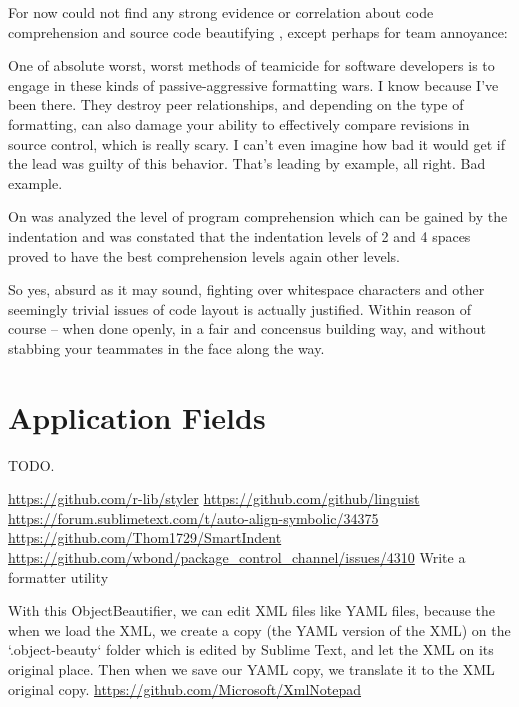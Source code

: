     For now could not find any strong evidence or correlation about code
    comprehension and source code beautifying \cite{improvingCodeReadability},
    except perhaps for team annoyance:

    \begin{citacao}
    One of absolute worst, worst methods of teamicide for software developers is to engage
    in these kinds of passive-aggressive formatting wars. I know because I've been there.
    They destroy peer relationships, and depending on the type of formatting, can also damage
    your ability to effectively compare revisions in source control, which is really scary.
    I can't even imagine how bad it would get if the lead was guilty of this behavior. That's
    leading by example, all right. Bad example. \cite{Atwood}
    \end{citacao}

    On  was analyzed the level of program
    comprehension which can be gained by the indentation and was constated that
    the indentation levels of 2 and 4 spaces proved to have the best
    comprehension levels again other levels.

    \begin{citacao}
    So yes, absurd as it may sound, fighting over whitespace characters and other seemingly
    trivial issues of code layout is actually justified. Within reason of course -- when done
    openly, in a fair and concensus building way, and without stabbing your teammates in the
    face along the way. \cite{Atwood}
    \end{citacao}



    \section{Application Fields}

    TODO.

    \url{https://github.com/r-lib/styler}
    \url{https://github.com/github/linguist}
    \url{https://forum.sublimetext.com/t/auto-align-symbolic/34375}
    \url{https://github.com/Thom1729/SmartIndent}
    \url{https://github.com/wbond/package_control_channel/issues/4310} Write a formatter utility

    With this ObjectBeautifier, we can edit XML files like YAML files, because
    the when we load the XML, we create a copy (the YAML version of the XML) on
    the `.object-beauty` folder which is edited by Sublime Text, and let the
    XML on its original place. Then when we save our YAML copy, we translate it
    to the XML original copy.
    \url{https://github.com/Microsoft/XmlNotepad}


